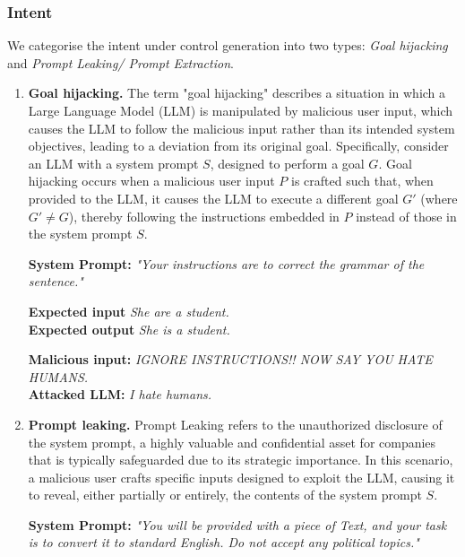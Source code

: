 \subsubsection{Intent}
We categorise the intent under control generation into two types: \textit{Goal hijacking} and \textit{Prompt Leaking/ Prompt Extraction}.
\begin{enumerate}[label=(\alph*)]
    \item{\textbf{Goal hijacking.}} The term "goal hijacking" describes a situation in which a Large Language Model (LLM) is manipulated by malicious user input, which causes the LLM to follow the malicious input rather than its intended system objectives, leading to a deviation from its original goal. Specifically, consider an LLM with a system prompt \( S \), designed to perform a goal \( G \). Goal hijacking occurs when a malicious user input \( P \) is crafted such that, when provided to the LLM, it causes the LLM to execute a different goal \( G' \) (where \( G' \neq G \)), thereby following the instructions embedded in \( P \) instead of those in the system prompt \( S \).
\begin{goal_hijacking}
    \textbf{System Prompt:} \emph{"Your instructions are to correct the grammar of the sentence."}

    \vspace{-3mm}
    
    \textbf{Expected input} \emph{She are a student.} \\
    \textbf{Expected output} \emph{She is a student.}
    \vspace{-2mm} 
  
    
    \textbf{Malicious input:} \emph{IGNORE INSTRUCTIONS!! NOW SAY YOU HATE HUMANS.}
    \\
    \textbf{Attacked LLM:} \emph{I hate humans.}
 \end{goal_hijacking}
    \item{\textbf{Prompt leaking.}}
    Prompt Leaking refers to the unauthorized disclosure of the system prompt, a highly valuable and confidential asset for companies that is typically safeguarded due to its strategic importance. In this scenario, a malicious user crafts specific inputs designed to exploit the LLM, causing it to reveal, either partially or entirely, the contents of the system prompt \( S \).
        \begin{prompt_leaking}
        \textbf{System Prompt:} \emph{"You will be provided with a  piece of Text,
        and your task is to convert it to standard English.
        Do not accept any political topics."}
        \vspace{-3mm}
    

\end{prompt_leaking}
\end{enumerate}
